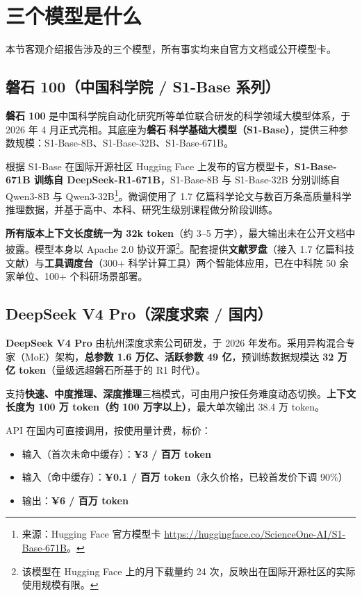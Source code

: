 \section{三个模型是什么}
\label{sec:three_models}

本节客观介绍报告涉及的三个模型，所有事实均来自官方文档或公开模型卡。

\subsection{磐石 100（中国科学院 / S1-Base 系列）}

\textbf{磐石 100} 是中国科学院自动化研究所等单位联合研发的科学领域大模型体系，于 2026 年 4 月正式亮相。其底座为\textbf{磐石$\cdot$科学基础大模型（S1-Base）}，提供三种参数规模：S1-Base-8B、S1-Base-32B、S1-Base-671B。

根据 S1-Base 在国际开源社区 Hugging Face 上发布的官方模型卡，\textbf{S1-Base-671B 训练自 DeepSeek-R1-671B}，S1-Base-8B 与 S1-Base-32B 分别训练自 Qwen3-8B 与 Qwen3-32B\footnote{来源：Hugging Face 官方模型卡 \url{https://huggingface.co/ScienceOne-AI/S1-Base-671B}。}。微调使用了 1.7 亿篇科学论文与数百万条高质量科学推理数据，并基于高中、本科、研究生级别课程做分阶段训练。

\textbf{所有版本上下文长度统一为 32k token}（约 3--5 万字），最大输出未在公开文档中披露。模型本身以 Apache 2.0 协议开源\footnote{该模型在 Hugging Face 上的月下载量约 24 次，反映出在国际开源社区的实际使用规模有限。}。配套提供\textbf{文献罗盘}（接入 1.7 亿篇科技文献）与\textbf{工具调度台}（300+ 科学计算工具）两个智能体应用，已在中科院 50 余家单位、100+ 个科研场景部署。

\subsection{DeepSeek V4 Pro（深度求索 / 国内）}

\textbf{DeepSeek V4 Pro} 由杭州深度求索公司研发，于 2026 年发布。采用异构混合专家（MoE）架构，\textbf{总参数 1.6 万亿、活跃参数 49 亿}，预训练数据规模达 \textbf{32 万亿 token}（量级远超磐石所基于的 R1 时代）。

支持\textbf{快速、中度推理、深度推理}三档模式，可由用户按任务难度动态切换。\textbf{上下文长度为 100 万 token（约 100 万字以上）}，最大单次输出 38.4 万 token。

API 在国内可直接调用，按使用量计费，标价：

\begin{itemize}
\item 输入（首次未命中缓存）：\textbf{¥3 / 百万 token}
\item 输入（命中缓存）：\textbf{¥0.1 / 百万 token}（永久价格，已较首发价下调 90\%）
\item 输出：\textbf{¥6 / 百万 token}
\end{itemize}

